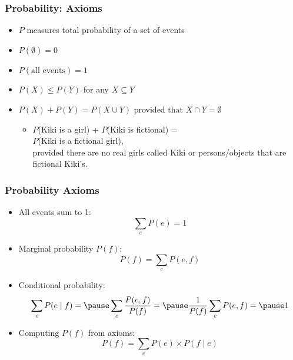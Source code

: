 \documentclass[handout]{beamer}
\begin{document}
\begin{frame}
\frametitle{Probability: Axioms}
\begin{itemize}[<+->]
\item $P$ measures total probability of a set of events
\item $P(\emptyset) = 0$
\item $P(\mbox{all events}) = 1$
\item $P(X) \leq P(Y)$ for any $X \subseteq Y$
\item $P(X) + P(Y) = P(X \cup Y)$ provided that $X \cap Y = \emptyset$
\begin{itemize}
\item $P$(Kiki is a girl) + $P$(Kiki is fictional) = \\
$P$(Kiki is a fictional girl), \\
provided there are no real girls called Kiki or persons/objects that are fictional Kiki's.
\end{itemize}

\end{itemize}

\end{frame}

\begin{frame}
\frametitle{Probability Axioms}
\begin{itemize}[<+->]
\item All events sum to 1: \[ \sum_e P(e) = 1 \]
\item Marginal probability $P(f)$: \[ P(f) = \sum_e P(e, f)  \]
\item Conditional probability: \[ \sum_e P(e \mid f) = \pause \sum_e \frac{P(e,f)}{P(f)} = \pause \frac{1}{P(f)} \sum_e P(e,f) = \pause 1 \]
\item Computing $P(f)$ from axioms: \[ P(f) = \sum_e P(e) \times
  P(f \mid e) \]
\end{itemize}

\end{frame}
\end{document}
